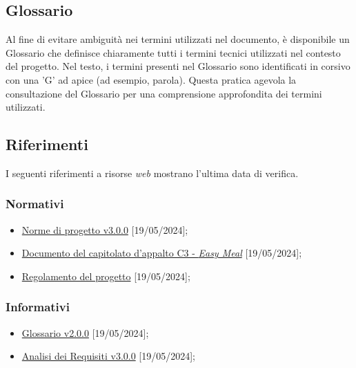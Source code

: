 \subsection{Glossario}
Al fine di evitare ambiguità nei termini utilizzati nel documento, è disponibile 
un Glossario che definisce chiaramente tutti i termini tecnici utilizzati nel 
contesto del progetto. Nel testo, i termini presenti nel Glossario sono 
identificati in corsivo con una 'G' ad apice (ad esempio, parola\g ). 
Questa pratica agevola la consultazione del Glossario per una comprensione 
approfondita dei termini utilizzati.

\subsection{Riferimenti}
I seguenti riferimenti a risorse \textit{web} mostrano l'ultima data di verifica.
\subsubsection{Normativi}
\begin{itemize}
	\item \href{https://project-swenergy.github.io/}{Norme di progetto v3.0.0} [19/05/2024];
	\item 	\href{https://www.math.unipd.it/~tullio/IS-1/2023/Progetto/C3.pdf}{Documento del capitolato d'appalto C3 - \textit{Easy Meal}} [19/05/2024];
	\item \href{https://www.math.unipd.it/~tullio/IS-1/2023/Dispense/PD2.pdf}{Regolamento del progetto} [19/05/2024]; 
\end{itemize}

\subsubsection{Informativi}
\begin{itemize}
	\item \href{https://project-swenergy.github.io/}{Glossario v2.0.0} [19/05/2024];
	\item \href{https://project-swenergy.github.io/}{Analisi dei Requisiti v3.0.0} [19/05/2024];
\end{itemize}
